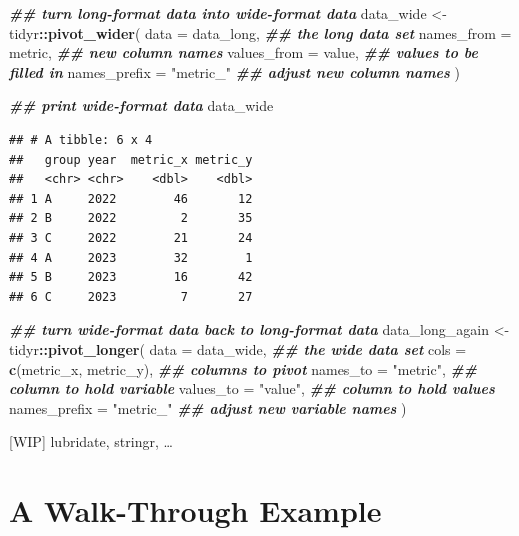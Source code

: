 \documentclass[
]{krantz}
\makeatletter
\newenvironment{Shaded}{\begin{snugshade}}{\end{snugshade}}
\newcommand{\AttributeTok}[1]{\textcolor[rgb]{0.27,0.27,0.27}{#1}}
\newcommand{\DocumentationTok}[1]{\textcolor[rgb]{0.37,0.37,0.37}{\textbf{\textit{#1}}}}
\newcommand{\FunctionTok}[1]{\textcolor[rgb]{0.27,0.27,0.27}{\textbf{#1}}}
\newcommand{\NormalTok}[1]{#1}
\newcommand{\OtherTok}[1]{\textcolor[rgb]{0.37,0.37,0.37}{#1}}
\newcommand{\SpecialCharTok}[1]{\textcolor[rgb]{0.43,0.43,0.43}{\textbf{#1}}}
\newcommand{\StringTok}[1]{\textcolor[rgb]{0.5,0.5,0.5}{#1}}
\newenvironment{kframe}{%
\medskip{}
\setlength{\fboxsep}{.8em}
 \def\at@end@of@kframe{}%
 \ifinner\ifhmode%
  \def\at@end@of@kframe{\end{minipage}}%
  \begin{minipage}{\columnwidth}%
 \fi\fi%
 \def\FrameCommand##1{\hskip\@totalleftmargin \hskip-\fboxsep
 \colorbox{shadecolor}{##1}\hskip-\fboxsep
     \hskip-\linewidth \hskip-\@totalleftmargin \hskip\columnwidth}%
 \MakeFramed {\advance\hsize-\width
   \@totalleftmargin\z@ \linewidth\hsize
   \@setminipage}}%
 {\par\unskip\endMakeFramed%
 \at@end@of@kframe}
\renewenvironment{Shaded}{\begin{kframe}}{\end{kframe}}
\makeatother
\begin{document}
\begin{Shaded}
\begin{Highlighting}[]
\DocumentationTok{\#\# turn long{-}format data into wide{-}format data}
\NormalTok{data\_wide }\OtherTok{\textless{}{-}}\NormalTok{ tidyr}\SpecialCharTok{::}\FunctionTok{pivot\_wider}\NormalTok{(}
  \AttributeTok{data =}\NormalTok{ data\_long,        }\DocumentationTok{\#\# the long data set}
  \AttributeTok{names\_from =}\NormalTok{ metric,     }\DocumentationTok{\#\# new column names}
  \AttributeTok{values\_from =}\NormalTok{ value,     }\DocumentationTok{\#\# values to be filled in}
  \AttributeTok{names\_prefix =} \StringTok{"metric\_"} \DocumentationTok{\#\# adjust new column names}
\NormalTok{)}

\DocumentationTok{\#\# print wide{-}format data}
\NormalTok{data\_wide}
\end{Highlighting}
\end{Shaded}

\begin{verbatim}
## # A tibble: 6 x 4
##   group year  metric_x metric_y
##   <chr> <chr>    <dbl>    <dbl>
## 1 A     2022        46       12
## 2 B     2022         2       35
## 3 C     2022        21       24
## 4 A     2023        32        1
## 5 B     2023        16       42
## 6 C     2023         7       27
\end{verbatim}

\begin{Shaded}
\begin{Highlighting}[]
\DocumentationTok{\#\# turn wide{-}format data back to long{-}format data}
\NormalTok{data\_long\_again }\OtherTok{\textless{}{-}}\NormalTok{ tidyr}\SpecialCharTok{::}\FunctionTok{pivot\_longer}\NormalTok{(}
  \AttributeTok{data =}\NormalTok{ data\_wide,             }\DocumentationTok{\#\# the wide data set}
  \AttributeTok{cols =} \FunctionTok{c}\NormalTok{(metric\_x, metric\_y), }\DocumentationTok{\#\# columns to pivot}
  \AttributeTok{names\_to =} \StringTok{"metric"}\NormalTok{,          }\DocumentationTok{\#\# column to hold variable}
  \AttributeTok{values\_to =} \StringTok{"value"}\NormalTok{,          }\DocumentationTok{\#\# column to hold values}
  \AttributeTok{names\_prefix =} \StringTok{"metric\_"}      \DocumentationTok{\#\# adjust new variable names}
\NormalTok{)}
\end{Highlighting}
\end{Shaded}

{[}WIP{]} lubridate, stringr, \ldots{}

\hypertarget{walkthrough}{%
\chapter{A Walk-Through Example}\label{walkthrough}}
\end{document}
